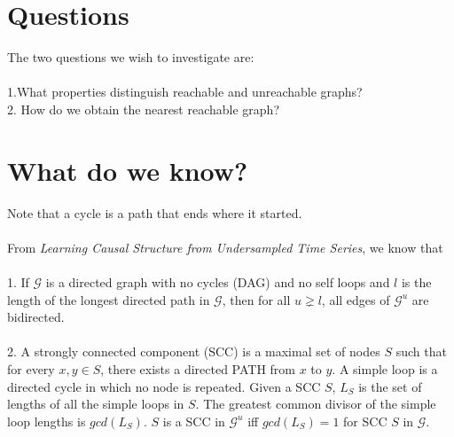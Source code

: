 \documentclass{article}
\theoremstyle{definition}
\begin{document}
\newpage

\section{Questions}

The two questions we wish to investigate are:
\\
\\
1.What properties distinguish reachable and unreachable graphs? 
\\
2. How do we obtain the nearest reachable graph?

\section{What do we know?}
Note that a cycle is a path that ends where it started.
\\
\\
From \textit{Learning Causal Structure from Undersampled Time Series}, we know that 
\\
\\
1. If $\mathcal{G}$ is a directed graph with no cycles (DAG) and no self loops and $l$ is the length of the longest directed path in $\mathcal{G}$, then for all $u \gneq l$, all edges of $\mathcal{G}^u$ are bidirected. 
\\
\\
2. A strongly connected component (SCC) is a maximal set of nodes $S$ such that for every $x,y \in S$, there exists a directed PATH from $x$ to $y$. A simple loop is a directed cycle in which no node is repeated. Given a SCC $S$, $L_S$ is the set of lengths of all the simple loops in $S$. The greatest common divisor of the simple loop lengths is $gcd(L_S)$. $S$ is a SCC in $\mathcal{G}^u$ iff $gcd(L_S)=1$ for SCC $S$ in $\mathcal{G}$.


	


\end{document}
